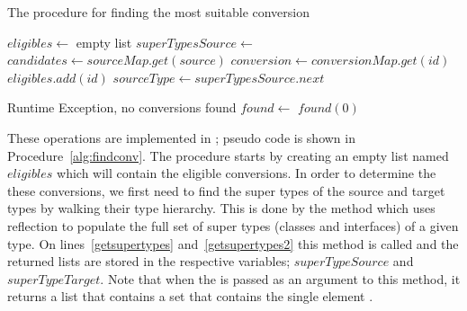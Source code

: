 \begin{algorithm}
\caption{The procedure for finding the most suitable conversion}\label{alg:findconv}
	\begin{algorithmic}[1]
		\State $eligibles \gets$ empty list
		\State $superTypesSource \gets$  \label{getsupertypes}
		 \label{fc:while:b}
		 \label{checksourcemap}
			\State $candidates \gets sourceMap.get(source)$ \label{candidates}
			 \label{fc:for:b}
			\State $conversion \gets conversionMap.get(id)$ \label{retconv}
			 \label{checktarget}
				\State $eligibles.add(id)$
			\EndIf
			\EndFor \label{fc:for:e}
		\Else
			\State $sourceType \gets superTypesSource.next$
		\EndIf
		\EndWhile \label{fc:while:e}

		 \label{eligempty}
		\State Runtime Exception, no conversions found
		\Else
		\State $found \gets$  \label{findclosest}
		\EndIf
		\State \Return {} \label{resolve}
		\Else
		\State \Return $found(0)$
		\EndIf
		\EndProcedure
	\end{algorithmic}
\end{algorithm}





These operations are implemented in ; pseudo code is shown in Procedure~\ref{alg:findconv}.
The procedure starts by creating an empty list named $eligibles$ which will contain the eligible conversions.
In order to determine the these conversions, we first need to find the super types of the source and target types by walking their type hierarchy. 
This is done by the method  which uses reflection to populate the full set of super types (classes and interfaces) of a given type. 
On lines~\ref{getsupertypes} and~\ref{getsupertypes2} this method is called and the returned lists are stored in the respective variables; $superTypeSource$ and $superTypeTarget$. 
Note that when the  is passed as an argument to this method, it returns a list that contains a set that contains the single element .

